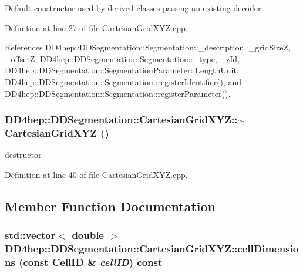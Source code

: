 Default constructor used by derived classes passing an existing decoder. 

Definition at line 27 of file CartesianGridXYZ.cpp.

References DD4hep::DDSegmentation::Segmentation::\_\-description, \_\-gridSizeZ, \_\-offsetZ, DD4hep::DDSegmentation::Segmentation::\_\-type, \_\-zId, DD4hep::DDSegmentation::SegmentationParameter::LengthUnit, DD4hep::DDSegmentation::Segmentation::registerIdentifier(), and DD4hep::DDSegmentation::Segmentation::registerParameter().\hypertarget{class_d_d4hep_1_1_d_d_segmentation_1_1_cartesian_grid_x_y_z_aff2cbae986ce2cec75de80968a1015a3}{
\subsubsection[{$\sim$CartesianGridXYZ}]{\setlength{\rightskip}{0pt plus 5cm}DD4hep::DDSegmentation::CartesianGridXYZ::$\sim$CartesianGridXYZ ()}}
\label{class_d_d4hep_1_1_d_d_segmentation_1_1_cartesian_grid_x_y_z_aff2cbae986ce2cec75de80968a1015a3}


destructor 

Definition at line 40 of file CartesianGridXYZ.cpp.

\subsection{Member Function Documentation}
\hypertarget{class_d_d4hep_1_1_d_d_segmentation_1_1_cartesian_grid_x_y_z_a6a1df52f930ef7fea680bfd532d0b6cb}{
\subsubsection[{cellDimensions}]{\setlength{\rightskip}{0pt plus 5cm}std::vector$<$ double $>$ DD4hep::DDSegmentation::CartesianGridXYZ::cellDimensions (const {\bf CellID} \& {\em cellID}) const}}
\label{class_d_d4hep_1_1_d_d_segmentation_1_1_cartesian_grid_x_y_z_a6a1df52f930ef7fea680bfd532d0b6cb}


